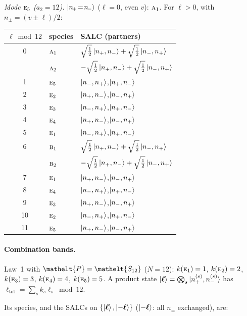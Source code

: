 \documentclass[11pt]{article}
\newcommand{\eltfont}[1]{{\let\sigma\eltsigma\mathelt{#1}}}
\newcommand{\irr}[1]{\text{\normalfont\scshape #1}}
\newcommand{\elt}[1]{\eltfont{#1}}
\newcommand{\pel}{\elt{P}}             %
\begin{document}
\emph{Mode $\irr{e}_{5}$ ($a_2=12$).} $\ket{n_{\!+}\!=\!n_{\!-}}$ ($\ell=0$, even $v$): $\irr{a}_{1}$. For $\ell>0$, with $n_\pm=(v\pm\ell)/2$:
\begin{longtable}{c l l}\hline $\ell\bmod 12$ & species & SALC (partners)\\ \hline\endhead
0 & $\irr{a}_{1}$ & $\sqrt{\tfrac{1}{2}}\ket{n_+,n_-}+\sqrt{\tfrac{1}{2}}\ket{n_-,n_+}$\\
 & $\irr{a}_{2}$ & $-\sqrt{\tfrac{1}{2}}\ket{n_+,n_-}+\sqrt{\tfrac{1}{2}}\ket{n_-,n_+}$\\
1 & $\irr{e}_{5}$ & $\ket{n_-,n_+}$,\quad $\ket{n_+,n_-}$\\
2 & $\irr{e}_{2}$ & $\ket{n_+,n_-}$,\quad $\ket{n_-,n_+}$\\
3 & $\irr{e}_{3}$ & $\ket{n_-,n_+}$,\quad $\ket{n_+,n_-}$\\
4 & $\irr{e}_{4}$ & $\ket{n_+,n_-}$,\quad $\ket{n_-,n_+}$\\
5 & $\irr{e}_{1}$ & $\ket{n_-,n_+}$,\quad $\ket{n_+,n_-}$\\
6 & $\irr{b}_{1}$ & $\sqrt{\tfrac{1}{2}}\ket{n_+,n_-}+\sqrt{\tfrac{1}{2}}\ket{n_-,n_+}$\\
 & $\irr{b}_{2}$ & $-\sqrt{\tfrac{1}{2}}\ket{n_+,n_-}+\sqrt{\tfrac{1}{2}}\ket{n_-,n_+}$\\
7 & $\irr{e}_{1}$ & $\ket{n_+,n_-}$,\quad $\ket{n_-,n_+}$\\
8 & $\irr{e}_{4}$ & $\ket{n_-,n_+}$,\quad $\ket{n_+,n_-}$\\
9 & $\irr{e}_{3}$ & $\ket{n_+,n_-}$,\quad $\ket{n_-,n_+}$\\
10 & $\irr{e}_{2}$ & $\ket{n_-,n_+}$,\quad $\ket{n_+,n_-}$\\
11 & $\irr{e}_{5}$ & $\ket{n_+,n_-}$,\quad $\ket{n_-,n_+}$\\
\hline\end{longtable}

\paragraph{Combination bands.}

Law~1 with $\pel=\elt{S_{12}}$ ($N=12$): $k(\irr{e}_{1})=1$, $k(\irr{e}_{2})=2$, $k(\irr{e}_{3})=3$, $k(\irr{e}_{4})=4$, $k(\irr{e}_{5})=5$. A product state $\ket{\boldsymbol\ell}=\bigotimes_s\ket{n_+^{(s)},n_-^{(s)}}$ has $\ell_{\mathrm{tot}}=\sum_sk_s\ell_s\bmod 12$.

Its species, and the SALCs on $\{\ket{\boldsymbol\ell},\ket{-\boldsymbol\ell}\}$ ($\ket{-\boldsymbol\ell}$: all $n_\pm$ exchanged), are:
\end{document}
